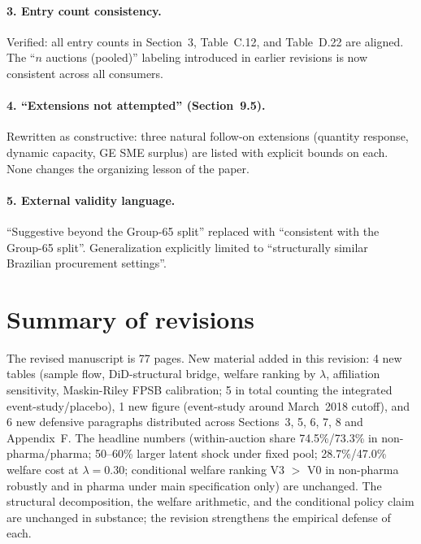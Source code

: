 \documentclass[11pt]{article}
\begin{document}
\paragraph{3. Entry count consistency.}
Verified: all entry counts in Section~3, Table~C.12, and Table~D.22 are aligned. The ``$n$ auctions (pooled)'' labeling introduced in earlier revisions is now consistent across all consumers.

\paragraph{4. ``Extensions not attempted'' (Section~9.5).}
Rewritten as constructive: three natural follow-on extensions (quantity response, dynamic capacity, GE SME surplus) are listed with explicit bounds on each. None changes the organizing lesson of the paper.

\paragraph{5. External validity language.}
``Suggestive beyond the Group-65 split'' replaced with ``consistent with the Group-65 split''. Generalization explicitly limited to ``structurally similar Brazilian procurement settings''.

\section*{Summary of revisions}

\noindent The revised manuscript is 77 pages. New material added in this revision: 4 new tables (sample flow, DiD-structural bridge, welfare ranking by $\lambda$, affiliation sensitivity, Maskin-Riley FPSB calibration; 5 in total counting the integrated event-study/placebo), 1 new figure (event-study around March~2018 cutoff), and 6 new defensive paragraphs distributed across Sections~3, 5, 6, 7, 8 and Appendix~F. The headline numbers (within-auction share 74.5\%/73.3\% in non-pharma/pharma; 50--60\% larger latent shock under fixed pool; 28.7\%/47.0\% welfare cost at $\lambda=0.30$; conditional welfare ranking V3 $>$ V0 in non-pharma robustly and in pharma under main specification only) are unchanged. The structural decomposition, the welfare arithmetic, and the conditional policy claim are unchanged in substance; the revision strengthens the empirical defense of each.
\end{document}
